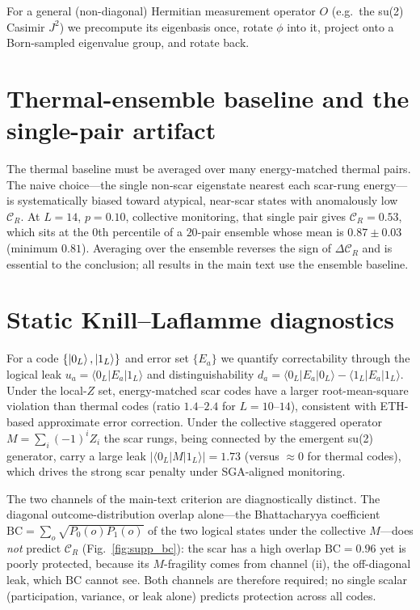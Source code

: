 \documentclass[aps,prxquantum,twocolumn,superscriptaddress,floatfix,longbibliography]{revtex4-2}
\newcommand{\CR}{\mathcal{C}_R}
\begin{document}
For a general (non-diagonal) Hermitian measurement operator $O$ (e.g.\ the su(2)
Casimir $J^2$) we precompute its eigenbasis once, rotate $\phi$ into it, project
onto a Born-sampled eigenvalue group, and rotate back.

\section{Thermal-ensemble baseline and the single-pair artifact}

The thermal baseline must be averaged over many energy-matched thermal pairs.
The naive choice---the single non-scar eigenstate nearest each scar-rung
energy---is systematically biased toward atypical, near-scar states with
anomalously low $\CR$. At $L=14$, $p=0.10$, collective monitoring, that single
pair gives $\CR=0.53$, which sits at the $0$th percentile of a $20$-pair
ensemble whose mean is $0.87\pm0.03$ (minimum $0.81$). Averaging over the
ensemble reverses the sign of $\Delta\CR$ and is essential to the conclusion;
all results in the main text use the ensemble baseline.

\section{Static Knill--Laflamme diagnostics}

For a code $\{\ket{0_L},\ket{1_L}\}$ and error set $\{E_a\}$ we quantify
correctability through the logical leak $u_a=\langle0_L|E_a|1_L\rangle$ and
distinguishability $d_a=\langle0_L|E_a|0_L\rangle-\langle1_L|E_a|1_L\rangle$.
Under the local-$Z$ set, energy-matched scar codes have a larger root-mean-square
violation than thermal codes (ratio $1.4$--$2.4$ for $L=10$--$14$), consistent
with ETH-based approximate error correction. Under the collective staggered
operator $M=\sum_i(-1)^iZ_i$ the scar rungs, being connected by the emergent
su(2) generator, carry a large leak $|\langle0_L|M|1_L\rangle|=1.73$ (versus
$\approx0$ for thermal codes), which drives the strong scar penalty under
SGA-aligned monitoring.

The two channels of the main-text criterion are diagnostically distinct. The
diagonal outcome-distribution overlap alone---the Bhattacharyya coefficient
$\mathrm{BC}=\sum_o\sqrt{P_0(o)P_1(o)}$ of the two logical states under the
collective $M$---does \emph{not} predict $\CR$ (Fig.~\ref{fig:supp_bc}): the
scar has a high overlap $\mathrm{BC}=0.96$ yet is poorly protected, because its
$M$-fragility comes from channel (ii), the off-diagonal leak, which $\mathrm{BC}$
cannot see. Both channels are therefore required; no single scalar
(participation, variance, or leak alone) predicts protection across all codes.
\end{document}
